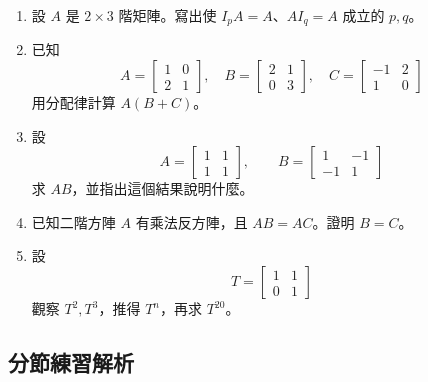 \documentclass[11pt,a4paper]{article}
\begin{document}
\begin{enumerate}
\def\labelenumi{\arabic{enumi}.}
\item
  設 \(A\) 是 \(2\times3\) 階矩陣。寫出使 \(I_pA=A\)、\(AI_q=A\) 成立的 \(p,q\)。
\item
  已知
  \[A=\begin{bmatrix}1&0\\2&1\end{bmatrix},\quad
  B=\begin{bmatrix}2&1\\0&3\end{bmatrix},\quad
  C=\begin{bmatrix}-1&2\\1&0\end{bmatrix}\]
  用分配律計算 \(A(B+C)\)。
\item
  設
  \[A=\begin{bmatrix}1&1\\1&1\end{bmatrix},\qquad
  B=\begin{bmatrix}1&-1\\-1&1\end{bmatrix}\]
  求 \(AB\)，並指出這個結果說明什麼。
\item
  已知二階方陣 \(A\) 有乘法反方陣，且 \(AB=AC\)。證明 \(B=C\)。
\item
  設
  \[T=\begin{bmatrix}1&1\\0&1\end{bmatrix}\]
  觀察 \(T^2,T^3\)，推得 \(T^n\)，再求 \(T^{20}\)。
\end{enumerate}

\subsection{分節練習解析}\label{ux5206ux7bc0ux7df4ux7fd2ux89e3ux6790-3}
\end{document}
